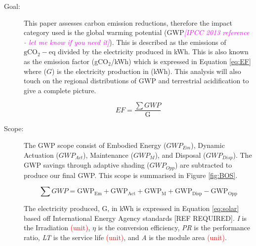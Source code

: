 \begin{description}
\item[Goal:] This paper assesses carbon emission reductions, therefore the impact category used is the global warming potential (GWP\textcolor{magenta}{\textit{[IPCC 2013 reference - let me know if you need it]}}). This is described as the emissions of ${\mathrm{gCO_2-eq}}$ divided by the electricity produced in kWh. This is also known as the emission factor (gCO$_2$/kWh) which is expressed in Equation \ref{eq:EF} where ($G$) is the electricity production in (kWh). This analysis will also touch on the regional distributions of GWP and terrestrial acidification to give a complete picture.

\begin{equation}
EF=\frac{{\sum GWP}}{\mathrm{G}}
\label{eq:EF}
\end{equation}

\item[Scope:] The GWP scope consist of Embodied Energy ($GWP_{Em}$), Dynamic Actuation ($GWP_{Act}$), Maintenance ($GWP_{M}$), and Disposal ($GWP_{Disp}$). The GWP savings through adaptive shading ($GWP_{Opp}$) are subtracted to produce our final GWP. This scope is summarised in Figure \ref{fig:BOS}.

\begin{equation}
\sum GWP={\mathrm{GWP_{Em}  + GWP_{Act} + GWP_{M} + GWP_{Disp} - GWP_{Opp} }}
\label{eq:GWP}
\end{equation}








The electricity produced, G, in kWh is expressed in Equation \ref{eq:solar} based off International Energy Agency standards [REF REQUIRED]. \textit{I} is the Irradiation \textcolor{red}{(unit)}, ${\eta}$ is the conversion efficiency, \textit{PR} is the performance ratio, \textit{LT} is the service life \textcolor{red}{(unit)}, and \textit{A} is the module area \textcolor{red}{(unit)}.


\end{description}
